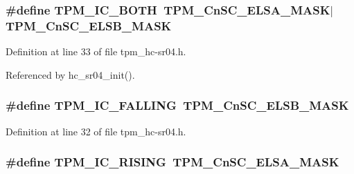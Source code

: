 \subsubsection[{\texorpdfstring{T\+P\+M\+\_\+\+I\+C\+\_\+\+B\+O\+TH}{TPM_IC_BOTH}}]{\setlength{\rightskip}{0pt plus 5cm}\#define T\+P\+M\+\_\+\+I\+C\+\_\+\+B\+O\+TH~{\bf T\+P\+M\+\_\+\+Cn\+S\+C\+\_\+\+E\+L\+S\+A\+\_\+\+M\+A\+SK}$\vert${\bf T\+P\+M\+\_\+\+Cn\+S\+C\+\_\+\+E\+L\+S\+B\+\_\+\+M\+A\+SK}}\hypertarget{tpm__hc-sr04_8h_ab1ae3178ab09f02ceaee88d6653fefa7}{}\label{tpm__hc-sr04_8h_ab1ae3178ab09f02ceaee88d6653fefa7}


Definition at line 33 of file tpm\+\_\+hc-\/sr04.\+h.



Referenced by hc\+\_\+sr04\+\_\+init().

\subsubsection[{\texorpdfstring{T\+P\+M\+\_\+\+I\+C\+\_\+\+F\+A\+L\+L\+I\+NG}{TPM_IC_FALLING}}]{\setlength{\rightskip}{0pt plus 5cm}\#define T\+P\+M\+\_\+\+I\+C\+\_\+\+F\+A\+L\+L\+I\+NG~{\bf T\+P\+M\+\_\+\+Cn\+S\+C\+\_\+\+E\+L\+S\+B\+\_\+\+M\+A\+SK}}\hypertarget{tpm__hc-sr04_8h_a2cf35e97bb9b97b3fd2fbb678bcdc2cc}{}\label{tpm__hc-sr04_8h_a2cf35e97bb9b97b3fd2fbb678bcdc2cc}


Definition at line 32 of file tpm\+\_\+hc-\/sr04.\+h.

\subsubsection[{\texorpdfstring{T\+P\+M\+\_\+\+I\+C\+\_\+\+R\+I\+S\+I\+NG}{TPM_IC_RISING}}]{\setlength{\rightskip}{0pt plus 5cm}\#define T\+P\+M\+\_\+\+I\+C\+\_\+\+R\+I\+S\+I\+NG~{\bf T\+P\+M\+\_\+\+Cn\+S\+C\+\_\+\+E\+L\+S\+A\+\_\+\+M\+A\+SK}}\hypertarget{tpm__hc-sr04_8h_ab44acfdb24b901a8097e384c44f8129b}{}\label{tpm__hc-sr04_8h_ab44acfdb24b901a8097e384c44f8129b}


